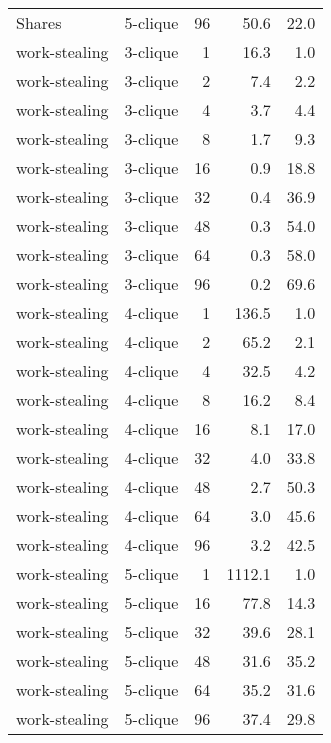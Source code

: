 \begin{tabular}{llr|rr}
        Shares &  5-clique &           96 &    50.6 &     22.0 \\
 work-stealing &  3-clique &            1 &    16.3 &      1.0 \\
 work-stealing &  3-clique &            2 &     7.4 &      2.2 \\
 work-stealing &  3-clique &            4 &     3.7 &      4.4 \\
 work-stealing &  3-clique &            8 &     1.7 &      9.3 \\
 work-stealing &  3-clique &           16 &     0.9 &     18.8 \\
 work-stealing &  3-clique &           32 &     0.4 &     36.9 \\
 work-stealing &  3-clique &           48 &     0.3 &     54.0 \\
 work-stealing &  3-clique &           64 &     0.3 &     58.0 \\
 work-stealing &  3-clique &           96 &     0.2 &     69.6 \\
 work-stealing &  4-clique &            1 &   136.5 &      1.0 \\
 work-stealing &  4-clique &            2 &    65.2 &      2.1 \\
 work-stealing &  4-clique &            4 &    32.5 &      4.2 \\
 work-stealing &  4-clique &            8 &    16.2 &      8.4 \\
 work-stealing &  4-clique &           16 &     8.1 &     17.0 \\
 work-stealing &  4-clique &           32 &     4.0 &     33.8 \\
 work-stealing &  4-clique &           48 &     2.7 &     50.3 \\
 work-stealing &  4-clique &           64 &     3.0 &     45.6 \\
 work-stealing &  4-clique &           96 &     3.2 &     42.5 \\
 work-stealing &  5-clique &            1 &  1112.1 &      1.0 \\
 work-stealing &  5-clique &           16 &    77.8 &     14.3 \\
 work-stealing &  5-clique &           32 &    39.6 &     28.1 \\
 work-stealing &  5-clique &           48 &    31.6 &     35.2 \\
 work-stealing &  5-clique &           64 &    35.2 &     31.6 \\
 work-stealing &  5-clique &           96 &    37.4 &     29.8 \\
\bottomrule
\end{tabular}
